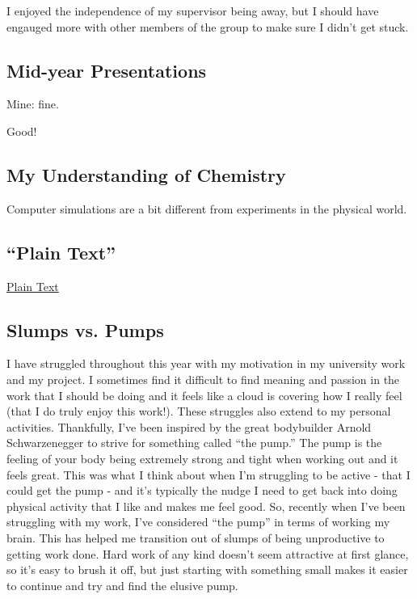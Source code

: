 \documentclass[11pt]{article}
\begin{document}
I enjoyed the independence of my supervisor being away, but I should have engauged more with other members of the group to make sure I didn't get stuck.

\subsection{Mid-year Presentations}

Mine: fine.

Good!

\subsection{My Understanding of Chemistry}

Computer simulations are a bit different from experiments in the physical world.

\subsection{``Plain Text''}

\href{https://www.youtube.com/watch?v=gd5uJ7Nlvvo}{Plain Text}

\subsection{Slumps vs. Pumps}

I have struggled throughout this year with my motivation in my university work and my project. I sometimes find it difficult to find meaning and passion in the work that I should be doing and it feels like a cloud is covering how I really feel (that I do truly enjoy this work!). These struggles also extend to my personal activities. Thankfully, I've been inspired by the great bodybuilder Arnold Schwarzenegger to strive for something called ``the pump.'' The pump is the feeling of your body being extremely strong and tight when working out and it feels great. This was what I think about when I'm struggling to be active - that I could get the pump - and it's typically the nudge I need to get back into doing physical activity that I like and makes me feel good. So, recently when I've been struggling with my work, I've considered ``the pump'' in terms of working my brain. This has helped me transition out of slumps of being unproductive to getting work done. Hard work of any kind doesn't seem attractive at first glance, so it's easy to brush it off, but just starting with something small makes it easier to continue and try and find the elusive pump.
\end{document}

